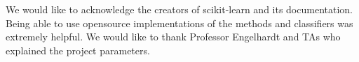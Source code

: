 We would like to acknowledge the creators of scikit-learn and its documentation. Being able to use opensource implementations of the methods and classifiers was extremely helpful. We would like to thank Professor Engelhardt and TAs who explained the project parameters. 